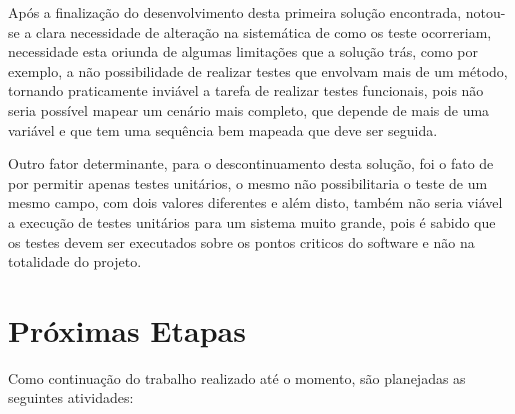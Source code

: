 \documentclass[tg]{mdtufsm}
\begin{document}
Após a finalização do desenvolvimento desta primeira solução encontrada, notou-se a clara necessidade de alteração na sistemática de como os teste ocorreriam, necessidade esta oriunda de algumas limitações que a solução trás, como por exemplo, a não possibilidade de realizar testes que envolvam mais de um método, tornando praticamente inviável a tarefa de realizar testes funcionais, pois não seria possível mapear um cenário mais completo, que depende de mais de uma variável e que tem uma sequência bem mapeada que deve ser seguida. 

Outro fator determinante, para o descontinuamento desta solução, foi o fato de por permitir apenas testes unitários, o mesmo não possibilitaria o teste de um mesmo campo, com dois valores diferentes e além disto, também não seria viável a execução de testes unitários para um sistema muito grande, pois é sabido que os testes devem ser executados sobre os pontos criticos do software e não na totalidade do projeto.

\chapter{Próximas Etapas}
Como continuação do trabalho realizado até o momento, são planejadas as seguintes atividades:
\begin{enumerate}

\end{enumerate}
\setlength{\baselineskip}{\baselineskip}


\end{document}
